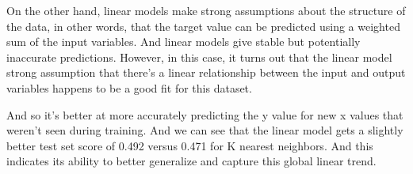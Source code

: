 \begin{multicols}{2}
On the other hand, linear models make strong assumptions about the structure of the data, in other words, that the target value can be predicted using a weighted sum of the input variables. And linear models give stable but potentially inaccurate predictions. However, in this case, it turns out that the linear model strong assumption that there's a linear relationship between the input and output variables happens to be a good fit for this dataset. 

And so it's better at more accurately predicting the y value for new x values that weren't seen during training. And we can see that the linear model gets a slightly better test set score of 0.492 versus 0.471 for K nearest neighbors. And this indicates its ability to better generalize and capture this global linear trend. 

\end{multicols}